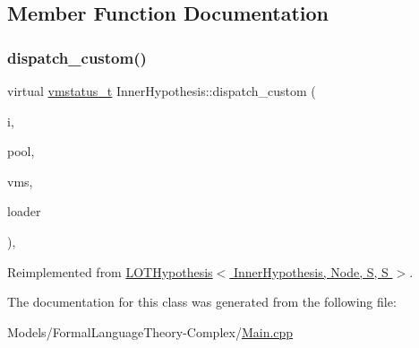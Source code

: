\subsection{Member Function Documentation}
\mbox{\label{class_inner_hypothesis_a9aea852725a3798aafeae5e7a5a0736b}} 
\subsubsection{\texorpdfstring{dispatch\+\_\+custom()}{dispatch\_custom()}}
{\footnotesize\ttfamily virtual \hyperlink{_instruction_8h_a6202215407ab29590bb936ca2996cf64}{vmstatus\+\_\+t} Inner\+Hypothesis\+::dispatch\+\_\+custom (\begin{DoxyParamCaption}\item[{\hyperlink{class_instruction}{Instruction}}]{i,  }\item[{\hyperlink{class_virtual_machine_pool}{Virtual\+Machine\+Pool}$<$ \hyperlink{_formal_language_theory-_complex_2_main_8cpp_a51c40915539205f0b5add30b0d68a4cb}{S}, \hyperlink{_formal_language_theory-_complex_2_main_8cpp_a51c40915539205f0b5add30b0d68a4cb}{S} $>$ $\ast$}]{pool,  }\item[{\hyperlink{class_virtual_machine_state}{Virtual\+Machine\+State}$<$ \hyperlink{_formal_language_theory-_complex_2_main_8cpp_a51c40915539205f0b5add30b0d68a4cb}{S}, \hyperlink{_formal_language_theory-_complex_2_main_8cpp_a51c40915539205f0b5add30b0d68a4cb}{S} $>$ $\ast$}]{vms,  }\item[{\hyperlink{class_dispatchable}{Dispatchable}$<$ \hyperlink{_formal_language_theory-_complex_2_main_8cpp_a51c40915539205f0b5add30b0d68a4cb}{S}, \hyperlink{_formal_language_theory-_complex_2_main_8cpp_a51c40915539205f0b5add30b0d68a4cb}{S} $>$ $\ast$}]{loader }\end{DoxyParamCaption})\hspace{0.3cm}{\ttfamily [inline]}, {\ttfamily [virtual]}}



Reimplemented from \hyperlink{class_l_o_t_hypothesis_a6eae1ce4486971909e0245ab9e30ddeb}{L\+O\+T\+Hypothesis$<$ Inner\+Hypothesis, Node, S, S $>$}.



The documentation for this class was generated from the following file\+:\begin{DoxyCompactItemize}
\item 
Models/\+Formal\+Language\+Theory-\/\+Complex/\hyperlink{_formal_language_theory-_complex_2_main_8cpp}{Main.\+cpp}\end{DoxyCompactItemize}

